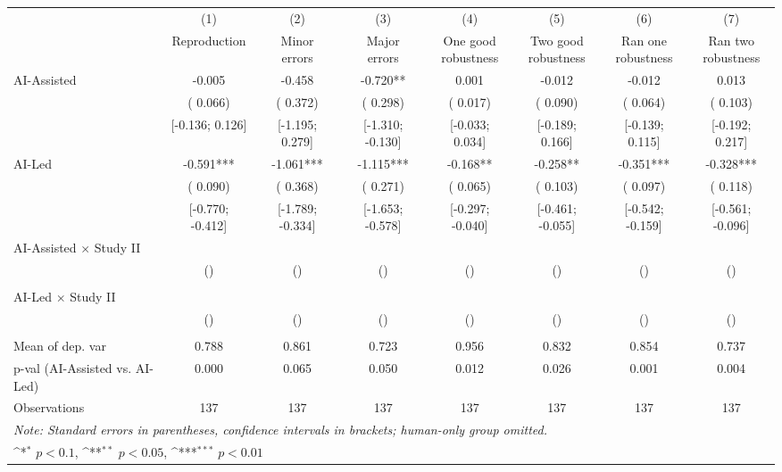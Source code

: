 \def\sym#1{\ifmmode^{#1}\else\(^{#1}\)\fi}
\begin{tabular}{l*{7}{c}}
\hline\hline
& (1) & (2) & (3) & (4) & (5) & (6) & (7)\\
                    &
Reproduction   &\shortstack[c]{Minor\\errors}   &\shortstack[c]{Major\\errors}   &\shortstack[c]{One good\\robustness}   &\shortstack[c]{Two good\\robustness}   &\shortstack[c]{Ran one\\robustness}   &\shortstack[c]{Ran two\\robustness}
   \\
\hline
AI-Assisted & -0.005 & -0.458 & -0.720** &  0.001 & -0.012 & -0.012 &  0.013 \\
 & ( 0.066) & ( 0.372) & ( 0.298) & ( 0.017) & ( 0.090) & ( 0.064) & ( 0.103) \\
 & [-0.136;  0.126] & [-1.195;  0.279] & [-1.310; -0.130] & [-0.033;  0.034] & [-0.189;  0.166] & [-0.139;  0.115] & [-0.192;  0.217] \\
AI-Led & -0.591*** & -1.061*** & -1.115*** & -0.168** & -0.258** & -0.351*** & -0.328*** \\
 & ( 0.090) & ( 0.368) & ( 0.271) & ( 0.065) & ( 0.103) & ( 0.097) & ( 0.118) \\
 & [-0.770; -0.412] & [-1.789; -0.334] & [-1.653; -0.578] & [-0.297; -0.040] & [-0.461; -0.055] & [-0.542; -0.159] & [-0.561; -0.096] \\
AI-Assisted $\times$ Study II &  &  &  &  &  &  &  \\
 & () & () & () & () & () & () & () \\
 &  &  &  &  &  &  &  \\
AI-Led $\times$ Study II &  &  &  &  &  &  &  \\
 & () & () & () & () & () & () & () \\
 &  &  &  &  &  &  &  \\
\hline
Mean of dep. var &  0.788 &  0.861 &  0.723 &  0.956 &  0.832 &  0.854 &  0.737 \\
p-val (AI-Assisted vs. AI-Led) &  0.000 &  0.065 &  0.050 &  0.012 &  0.026 &  0.001 &  0.004 \\
Observations & 137 & 137 & 137 & 137 & 137 & 137 & 137 \\
\hline\hline
\multicolumn{8}{l}{\it{Note:} Standard errors in parentheses, confidence intervals in brackets; human-only group omitted.}\\
\multicolumn{8}{l}{\sym{*} \(p<0.1\), \sym{**} \(p<0.05\), \sym{***} \(p<0.01\)}\\
\end{tabular}
